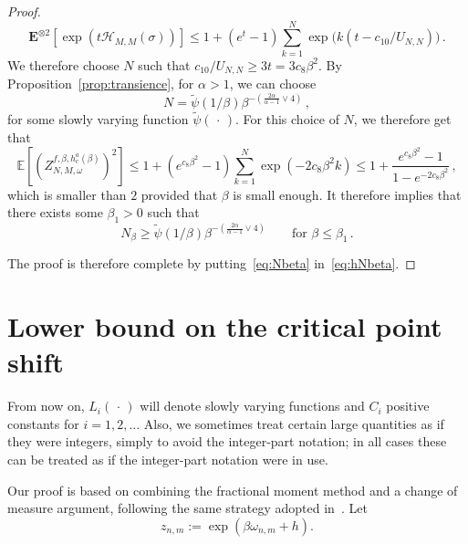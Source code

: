 \documentclass[AHL,Unicode,longabstracts]{cedram}
\newcommand{\ga}{\alpha}
\newcommand{\gb}{\beta}
\renewcommand{\tilde}{\widetilde}
\newcommand{\cH}{\ensuremath{\mathcal{H}}}
\newcommand{\bE}{\ensuremath{\mathbf{E}}}
\newcommand{\bbE}{\ensuremath{\mathbb{E}}}
\begin{document}
\begin{proof}
\begin{equation}
\bE^{\otimes 2} \left[\exp (t \cH_{M,M}(\sigma)) \right] \le 1 + (e^{t}-1) \sum_{k=1}^N \exp \Big(k (t - c_{10}/U_{N,N}) \Big)\,.
\end{equation}
We therefore choose $N$ such that $ c_{10}/U_{N,N} \ge 3 t = 3c_{8} \gb^2 $. By Proposition~\ref{prop:transience}, for $\ga >1$, we can choose
\begin{equation}
N =
\tilde \psi (1/\gb) \gb^{- (\frac{2\ga}{\ga-1} \vee 4)}\,,
\end{equation}
for some slowly varying function $\tilde\psi({\,\cdot\,})$. For this choice of $N$, we therefore get that
\begin{equation}
\bbE \left[\left(Z^{f,\beta,h_c^a(\beta)}_{N,M,\omega} \right)^2 \right] \le 1 + (e^{c_8 \beta^2} -1) \sum_{k=1}^N \exp(- 2 c_8 \beta^2 k) \le 1 + \frac{e^{c_8 \gb^2} -1}{1- e^{-2 c_8 \gb^2}}\,,
\end{equation}
which is smaller than $2$ provided that $\gb$ is small enough. It therefore implies that there exists some $\gb_1>0$ such that
\begin{equation}\label{eq:Nbeta}
N_\beta \ge
\tilde \psi (1/\gb) \gb^{- (\frac{2\ga}{\ga-1} \vee 4)} \qquad \text{for } \gb \leq \gb_1\,.
\end{equation}

The proof is therefore complete by putting~\eqref{eq:Nbeta} in~\eqref{eq:hNbeta}.
\end{proof}


\section{Lower bound on the critical point shift}\label{sec:fm}

From now on, $L_i({\,\cdot\,})$ will denote slowly varying functions and $C_i$ positive constants for $i=1,2,\dots$ Also, we sometimes treat certain large quantities as if they were integers, simply to avoid the integer-part notation; in all cases these can be treated as if the integer-part notation were in use.

Our proof is based on combining the fractional moment method and a change of measure argument, following the same strategy adopted in~\cite{cf:DGLT09}. Let
\begin{equation}
z_{n,m} := \exp \left(\beta \omega_{n,m} + h \right).
\end{equation}
\end{document}
